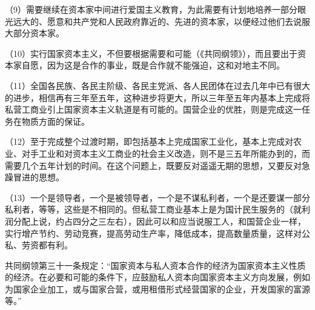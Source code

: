 （9）需要继续在资本家中间进行爱国主义教育，为此需要有计划地培养一部分眼光远大的、愿意和共产党和人民政府靠近的、先进的资本家，以便经过他们去说服大部分资本家。

（10）实行国家资本主义，不但要根据需要和可能（《共同纲领》），而且要出于资本家自愿，因为这是合作的事业，既是合作就不能强迫，这和对地主不同。

（11）全国各民族、各民主阶级、各民主党派、各人民团体在过去几年中已有很大的进步，相信再有三年至五年，这种进步将更大，所以三年至五年内基本上完成将私营工商业引上国家资本主义轨道是有可能的。国营企业的优胜，则是完成这一任务在物质方面的保证。

（12）至于完成整个过渡时期，即包括基本上完成国家工业化，基本上完成对农业、对手工业和对资本主义工商业的社会主义改造，则不是三五年所能办到的，而需要几个五年计划的时间。在这个问题上，既要反对遥遥无期的思想，又要反对急躁冒进的思想。

（13）一个是领导者，一个是被领导者，一个是不谋私利者，一个是还要谋一部分私利者，等等，这些是不相同的。但私营工商业基本上是为国计民生服务的（就利润分配上说，约占四分之三左右），因此可以和应当说服工人，和国营企业一样，实行增产节约、劳动竞赛，提高劳动生产率，降低成本，提高数量质量，这样对公私、劳资都有利。


\begin{maonote}
共同纲领第三十一条规定：“国家资本与私人资本合作的经济为国家资本主义性质的经济。在必要和可能的条件下，应鼓励私人资本向国家资本主义方向发展，例如为国家企业加工，或与国家合营，或用租借形式经营国家的企业，开发国家的富源等。”
\end{maonote}
